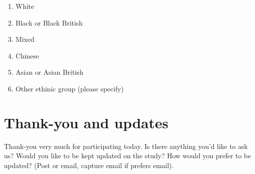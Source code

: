 \documentclass[a4paper,10pt]{article}
\begin{document}
\begin{enumerate}
\item White
\item Black or Black British
\item Mixed
\item Chinese
\item Asian or Asian British
\item Other ethinic group (please specify)
\end{enumerate}

\section{Thank-you and updates}
Thank-you very much for participating today. Is there anything you'd like to ask us? Would you like to be kept updated on the study? How would you prefer to be updated? 
(Post or email, capture email if prefers email).

\end{document}

